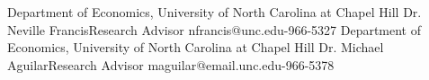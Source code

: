 

\begin{cventries}

 \cventry
    {Department of Economics, University of North Carolina at Chapel Hill}
    {Dr. Neville Francis\break Research Advisor}
    {nfrancis@unc.edu-966-5327}
    {} 
    {}
 \cventry
    {Department of Economics, University of North Carolina at Chapel Hill}
    {Dr. Michael Aguilar\break Research Advisor}
    {maguilar@email.unc.edu-966-5378}
    {} 
    {}



\end{cventries}
